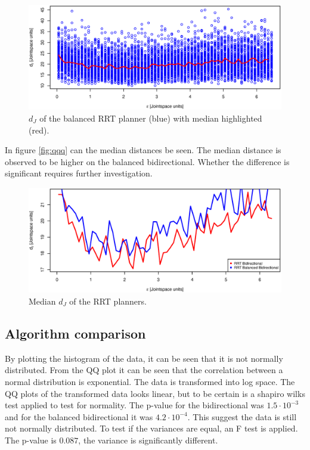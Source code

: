 \begin{figure}[h]
 \centering
 \includegraphics[width=\figsize]{graphics/balanced_correlation}
 \caption{\(d_J\) of the balanced RRT planner (blue) with median highlighted (red).}
 \label{fig:balanced_correlated}
\end{figure}

In figure \ref{fig:qqq} can the median distances be seen. 
The median distance is observed to be higher on the balanced bidirectional. 
Whether the difference is significant requires further investigation.

\begin{figure}[h]
 \centering
 \includegraphics[width=\figsize]{graphics/compare_distance}
 \caption{Median \(d_J\) of the RRT planners.}
 \label{fig:balanced_correlated}
\end{figure}

\subsection{Algorithm comparison}

By plotting the histogram of the data, it can be seen that it is not normally distributed. 
From the QQ plot it can be seen that the correlation between a normal distribution is exponential.
The data is transformed into log space.
The QQ plots of the transformed data looks linear, but to be certain is a shapiro wilks test applied to test for normality.
The p-value for the bidirectional was \(1.5\cdot10^{-3}\) and for the balanced bidirectional it was \(4.2\cdot10^{-4}\).
This suggest the data is still not normally distributed.
To test if the variances are equal, an F test is applied.
The p-value is  \(0.087\), the variance is significantly different.

